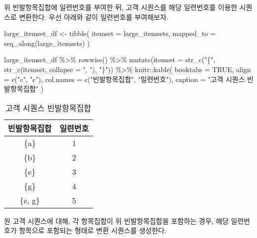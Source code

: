 \documentclass[
]{book}
\newenvironment{Shaded}{\begin{snugshade}}{\end{snugshade}}
\newcommand{\AttributeTok}[1]{\textcolor[rgb]{0.77,0.63,0.00}{#1}}
\newcommand{\ConstantTok}[1]{\textcolor[rgb]{0.00,0.00,0.00}{#1}}
\newcommand{\FunctionTok}[1]{\textcolor[rgb]{0.00,0.00,0.00}{#1}}
\newcommand{\NormalTok}[1]{#1}
\newcommand{\OtherTok}[1]{\textcolor[rgb]{0.56,0.35,0.01}{#1}}
\newcommand{\SpecialCharTok}[1]{\textcolor[rgb]{0.00,0.00,0.00}{#1}}
\newcommand{\StringTok}[1]{\textcolor[rgb]{0.31,0.60,0.02}{#1}}
\begin{document}
위 빈발항목집합에 일련번호를 부여한 뒤, 고객 시퀀스를 해당 일련번호를 이용한 시퀀스로 변환한다. 우선 아래와 같이 일련번호를 부여해보자.

\begin{Shaded}
\begin{Highlighting}[]
\NormalTok{large\_itemset\_df }\OtherTok{\textless{}{-}} \FunctionTok{tibble}\NormalTok{(}
  \AttributeTok{itemset =}\NormalTok{ large\_itemsets,}
  \AttributeTok{mapped\_to =} \FunctionTok{seq\_along}\NormalTok{(large\_itemsets)}
\NormalTok{)}

\NormalTok{large\_itemset\_df }\SpecialCharTok{\%\textgreater{}\%}
  \FunctionTok{rowwise}\NormalTok{() }\SpecialCharTok{\%\textgreater{}\%}
  \FunctionTok{mutate}\NormalTok{(}\AttributeTok{itemset =} \FunctionTok{str\_c}\NormalTok{(}\StringTok{"\{"}\NormalTok{, }\FunctionTok{str\_c}\NormalTok{(itemset, }\AttributeTok{collapse =} \StringTok{", "}\NormalTok{), }\StringTok{"\}"}\NormalTok{)) }\SpecialCharTok{\%\textgreater{}\%}
\NormalTok{  knitr}\SpecialCharTok{::}\FunctionTok{kable}\NormalTok{(}
    \AttributeTok{booktabs =} \ConstantTok{TRUE}\NormalTok{,}
    \AttributeTok{align =} \FunctionTok{c}\NormalTok{(}\StringTok{"c"}\NormalTok{, }\StringTok{"c"}\NormalTok{),}
    \AttributeTok{col.names =} \FunctionTok{c}\NormalTok{(}\StringTok{"빈발항목집합"}\NormalTok{, }\StringTok{"일련번호"}\NormalTok{),}
    \AttributeTok{caption =} \StringTok{"고객 시퀀스 빈발항목집합"}
\NormalTok{  )}
\end{Highlighting}
\end{Shaded}

\begin{table}

\caption{\label{tab:association-sequence-large-itemsets}고객 시퀀스 빈발항목집합}
\centering
\begin{tabular}[t]{cc}
\toprule
빈발항목집합 & 일련번호\\
\midrule
\{a\} & 1\\
\{b\} & 2\\
\{e\} & 3\\
\{g\} & 4\\
\{e, g\} & 5\\
\bottomrule
\end{tabular}
\end{table}

원 고객 시퀀스에 대해, 각 항목집합이 위 빈발항목집합을 포함하는 경우, 해당 일련번호가 항목으로 포함되는 형태로 변환 시퀀스를 생성한다.
\end{document}
